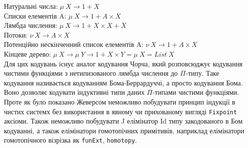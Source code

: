 \noindent Натуральні числа: $\mu\ X \rightarrow 1 + X$\\
Списки елементів A: $\mu\ X \rightarrow 1 + A \times X$\\
Лямбда числення: $\mu\ X \rightarrow 1 + X \times X + X$\\
Потоки: $\nu\ X \rightarrow A \times X$\\
Потенційно нескінченний список елементів A: $\nu\ X \rightarrow 1 + A \times X$\\
Кінцеве дерево: $\mu\ X \rightarrow \mu\ Y \rightarrow 1 + X \times Y = \mu\ X = List\ X$\\

Для цих кодувань існує аналог кодування Чорча, який розповсюджує
кодування чистими функціями з нетипизованого лямбда числення до $\Pi$-типу.
Таке кодування називається кодуванням Бома-Беррардуччі, а просто кодування Бома.
Воно дозволяє кодувати індуктивні типи даних $\Pi$-типами чистими функціями.
Проте як було показано Жеверсом\cite{Geuvers01} неможливо побудувати принцип
індукції в чистих системх без використання в явному чи прихованому
вигляді \lstinline{Fixpoint} аксіоми. Також неможливо побудувати
J елімінатор Id типу закодованого в Бом кодуванні, а також
елімінатори гомотопічних примітивів, наприклад елімінатори гомотопічного
візрізка як \lstinline{funExt}, \lstinline{homotopy}.

